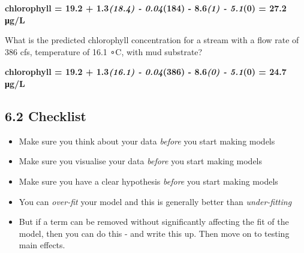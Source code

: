 \documentclass[
]{article}
\begin{document}
\textbf{chlorophyll = 19.2 + 1.3\emph{(18.4) - 0.04}(184) - 8.6\emph{(1)
- 5.1}(0) = 27.2 μg/L}

What is the predicted chlorophyll concentration for a stream with a flow
rate of 386 cfs, temperature of 16.1 ∘C, with mud substrate?

\textbf{chlorophyll = 19.2 + 1.3\emph{(16.1) - 0.04}(386) - 8.6\emph{(0)
- 5.1}(0) = 24.7 μg/L}

\hypertarget{checklist}{%
\subsection{6.2 Checklist}\label{checklist}}

\begin{itemize}
\item
  Make sure you think about your data \emph{before} you start making
  models
\item
  Make sure you visualise your data \emph{before} you start making
  models
\item
  Make sure you have a clear hypothesis \emph{before} you start making
  models
\item
  You can \emph{over-fit} your model and this is generally better than
  \emph{under-fitting}
\item
  But if a term can be removed without significantly affecting the fit
  of the model, then you can do this - and write this up. Then move on
  to testing main effects.
\end{itemize}
\end{document}
